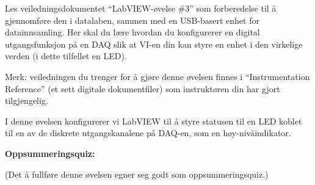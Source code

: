 
Les veiledningsdokumentet ``LabVIEW-øvelse \#3'' som forberedelse til å gjennomføre den i datalaben, sammen med en USB-basert enhet for datainnsamling. Her skal du lære hvordan du konfigurerer en digital utgangsfunksjon på en DAQ slik at VI-en din kan styre en enhet i den virkelige verden (i dette tilfellet en LED).

\vskip 10pt

Merk: veiledningen du trenger for å gjøre denne øvelsen finnes i ``Instrumentation Reference'' (et sett digitale dokumentfiler) som instruktøren din har gjort tilgjengelig.














I denne øvelsen konfigurerer vi LabVIEW til å styre statusen til en LED koblet til en av de diskrete utgangskanalene på DAQ-en, som en høy-nivåindikator.










\vfil \eject

\noindent
{\bf Oppsummeringsquiz:}

(Det å fullføre denne øvelsen egner seg godt som oppsummeringsquiz.)


